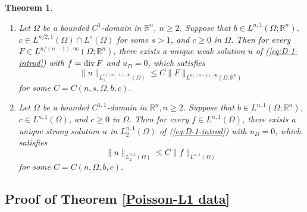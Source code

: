 \documentclass[reqno,centertags,11pt]{amsart}
\newtheorem{thm}{Theorem}
\theoremstyle{definition}
\numberwithin{thm}{section}
\numberwithin{equation}{section}
\newcommand{\R}{{\mathbb{R}}}
\begin{document}
\begin{thm}\label{existence of solutions}
\begin{enumerate}[{\upshape(i)}]
\item  Let $\Omega$ be a bounded $C^1$-domain in $\R^n   $, $n\ge 2$. Suppose that $b \in L^{n,1}(\Omega ; \R^n )$,    $ c \in L^{n/2,1}(\Omega )\cap L^s (\Omega )$ for some $s>1$, and $c \ge 0$ in $\Omega$.
Then for every   $F \in L^{n/(n-1),\infty}(\Omega ;\R^n )$, there exists a unique weak  solution  $u$  of (\ref{eq:D-1-introd}) with $f={\rm div}\, F$ and $u_D =0$, which satisfies
\[
   \|   u \|_{L_{1}^{n/(n-1),\infty}(\Omega )}  \le C   \|F \|_{L^{n/(n-1),\infty}(\Omega ;\R^n  )}
\]
for some $C=C(n,  s, \Omega ,b,c )$.
\item Let $\Omega$ be a bounded $C^{1,1}$-domain in $\R^n , n \ge 2 $.  Suppose that $b \in L^{n,1}(\Omega ; \R^n )$,    $ c \in L^{n,1}(\Omega )$, and $c \ge 0$ in $\Omega$.
Then for every $ f\in L^{n,1}  (\Omega   )$, there exists a unique  strong solution  $u  $  in $L^{n,1}_2 (\Omega )$ of  (\ref{eq:D-1-introd}) with $u_D =0$, which satisfies
\[
 \|   u \|_{L_2^{n,1}(\Omega ) }  \le C   \|f \|_{L^{n,1}  (\Omega  )}
\]
for some  $C=C(n,  \Omega, b,c )$.
\end{enumerate}
\end{thm}

\subsection{Proof  of Theorem  \ref{Poisson-L1 data}}
\end{document}
